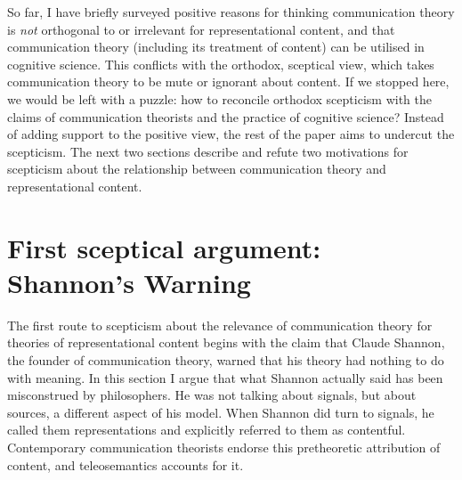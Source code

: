 \documentclass[12pt]{article}
\begin{document}


So far, I have briefly surveyed positive reasons for thinking communication theory is \textit{not} orthogonal to or irrelevant for representational content, and that communication theory (including its treatment of content) can be utilised in cognitive science.
This conflicts with the orthodox, sceptical view, which takes communication theory to be mute or ignorant about content.
If we stopped here, we would be left with a puzzle: how to reconcile orthodox scepticism with the claims of communication theorists and the practice of cognitive science?
Instead of adding support to the positive view, the rest of the paper aims to undercut the scepticism.
The next two sections describe and refute two motivations for scepticism about the relationship between communication theory and representational content.



\section{First sceptical argument: Shannon's Warning}\label{sec:warning}

The first route to scepticism about the relevance of communication theory for theories of representational content begins with the claim that Claude Shannon, the founder of communication theory, warned that his theory had nothing to do with meaning.
In this section I argue that what Shannon actually said has been misconstrued by philosophers.
He was not talking about signals, but about sources, a different aspect of his model.
When Shannon did turn to signals, he called them representations and explicitly referred to them as contentful.
Contemporary communication theorists endorse this pretheoretic attribution of content, and teleosemantics accounts for it.
\end{document}
